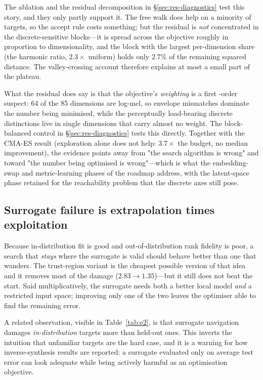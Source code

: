 \documentclass[11pt]{article}
\begin{document}
The ablation and the residual decomposition in \S\ref{sec:res-diagnostics} test
this story, and they only partly support it. The free walk does help on a
minority of targets, so the accept rule costs something; but the residual is
\emph{not} concentrated in the discrete-sensitive blocks---it is spread across
the objective roughly in proportion to dimensionality, and the block with the
largest per-dimension share (the harmonic ratio, $2.3\times$ uniform) holds
only $2.7\%$ of the remaining squared distance. The valley-crossing account
therefore explains at most a small part of the plateau.
\medskip

What the residual does say is that the objective's \emph{weighting} is a first
-order suspect: 64 of the 85 dimensions are log-mel, so envelope mismatches
dominate the number being minimised, while the perceptually load-bearing
discrete distinctions live in single dimensions that carry almost no weight.
The block-balanced control in \S\ref{sec:res-diagnostics} tests this directly.
Together with the CMA-ES result (exploration alone does not help: $3.7\times$
the budget, no median improvement), the evidence points away from "the search
algorithm is wrong" and toward "the number being optimised is wrong"---which is
what the embedding-swap and metric-learning phases of the roadmap address, with
the latent-space phase retained for the reachability problem that the discrete
axes still pose.

\subsection{Surrogate failure is extrapolation times exploitation}

Because in-distribution fit is good and out-of-distribution rank fidelity is
poor, a search that \emph{stays} where the surrogate is valid should behave
better than one that wanders. The trust-region variant is the cheapest possible
version of that idea and it removes most of the damage
($2.83 \rightarrow 1.35$)---but it still does not beat the start. Said multiplicatively, the surrogate needs both a
better local model \emph{and} a restricted input space; improving only one of the
two leaves the optimiser able to find the remaining error.

A related observation, visible in Table~\ref{tab:e2}, is that surrogate
navigation damages \emph{in-distribution} targets more than held-out ones. This
inverts the intuition that unfamiliar targets are the hard case, and it is a
warning for how inverse-synthesis results are reported: a surrogate evaluated
only on average test error can look adequate while being actively harmful as an
optimisation objective.
\end{document}
